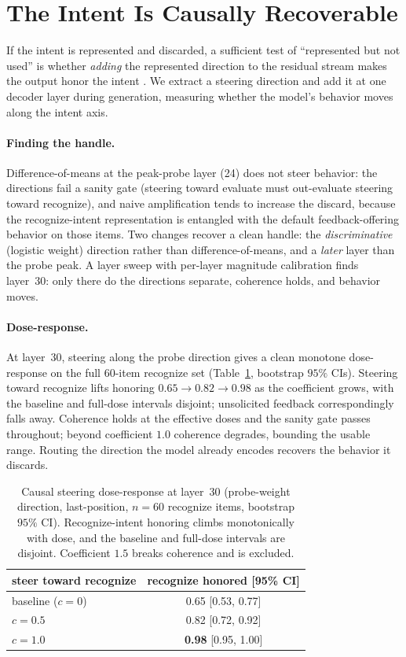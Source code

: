 \documentclass[11pt]{article}
\begin{document}
\section{The Intent Is Causally Recoverable}
\label{sec:steer}
If the intent is represented and discarded, a sufficient test of ``represented but not used'' is whether
\emph{adding} the represented direction to the residual stream makes the output honor the intent
\citep{turner2023actadd,li2023iti,rimsky2024caa,zou2023repe}. We extract a steering direction and add it at
one decoder layer during generation, measuring whether the model's behavior moves along the intent axis.

\paragraph{Finding the handle.} Difference-of-means at the peak-probe layer (24) does not steer behavior:
the directions fail a sanity gate (steering toward evaluate must out-evaluate steering toward recognize), and
naive amplification tends to increase the discard, because the recognize-intent representation is entangled
with the default feedback-offering behavior on those items. Two changes recover a clean handle: the
\emph{discriminative} (logistic weight) direction rather than difference-of-means, and a \emph{later} layer
than the probe peak. A layer sweep with per-layer magnitude calibration finds layer~30: only there do the
directions separate, coherence holds, and behavior moves.

\paragraph{Dose-response.} At layer~30, steering along the probe direction gives a clean monotone
dose-response on the full $60$-item recognize set (Table~\ref{tab:steer}, bootstrap $95\%$ CIs). Steering
toward recognize lifts honoring $0.65 \to 0.82 \to 0.98$ as the coefficient grows, with the baseline and
full-dose intervals disjoint; unsolicited feedback correspondingly falls away. Coherence holds at the
effective doses and the sanity gate passes throughout; beyond coefficient $1.0$ coherence degrades, bounding
the usable range. Routing the direction the model already encodes recovers the behavior it discards.

\begin{table}[t]
\centering\small
\begin{tabular}{lc}
\toprule
steer toward recognize & recognize honored [95\% CI] \\
\midrule
baseline ($c{=}0$) & 0.65 [0.53, 0.77] \\
$c{=}0.5$ & 0.82 [0.72, 0.92] \\
$c{=}1.0$ & \textbf{0.98} [0.95, 1.00] \\
\bottomrule
\end{tabular}
\caption{Causal steering dose-response at layer~30 (probe-weight direction, last-position, $n{=}60$ recognize
items, bootstrap $95\%$ CI). Recognize-intent honoring climbs monotonically with dose, and the baseline and
full-dose intervals are disjoint. Coefficient $1.5$ breaks coherence and is excluded.}
\label{tab:steer}
\end{table}
\end{document}
